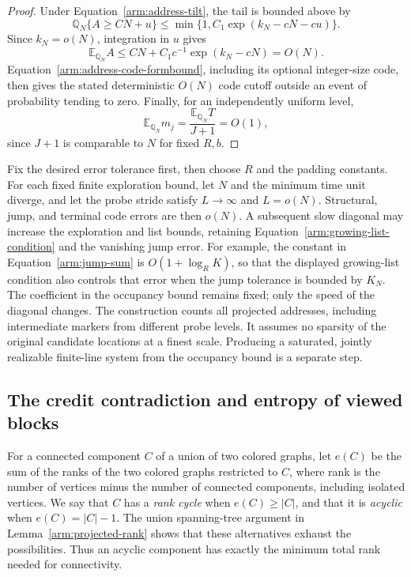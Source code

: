 \begin{proof}
Under Equation~\eqref{arm:address-tilt}, the tail is bounded above by
\[
 \mathbb Q_N\{A\geq CN+u\}
 \leq\min\{1,C_1\exp(k_N-cN-cu)\}.
\]
Since $k_N=o(N)$, integration in $u$ gives
\[
 \mathbb E_{\mathbb Q_N}A
 \leq CN+C_1c^{-1}\exp(k_N-cN)=O(N).
\]
Equation~\eqref{arm:address-code-formbound}, including its optional
integer-size code, then gives the stated deterministic $O(N)$ code
cutoff outside an event of probability tending to zero.  Finally,
for an independently uniform level,
\[
 \mathbb E_{\mathbb Q_N}m_j
 =\frac{\mathbb E_{\mathbb Q_N}T}{J+1}=O(1),
\]
since $J+1$ is comparable to $N$ for fixed $R,b$.
\end{proof}

\begin{remark}
Fix the desired error tolerance first, then choose $R$ and the padding
constants.  For each fixed finite exploration bound, let $N$ and the
minimum time unit diverge, and let the probe stride satisfy
$L\longrightarrow\infty$ and $L=o(N)$.  Structural, jump, and terminal
code errors are then $o(N)$.  A subsequent slow diagonal may increase
the exploration and list bounds, retaining
Equation~\eqref{arm:growing-list-condition} and the vanishing jump
error.  For example, the constant in Equation~\eqref{arm:jump-sum}
is $O(1+\log_R K)$, so that the displayed growing-list condition also
controls that error when the jump tolerance is bounded by $K_N$.
The coefficient in the occupancy bound remains fixed; only the speed
of the diagonal changes.  The construction counts all projected
addresses, including intermediate markers from different probe levels.
It assumes no sparsity of the original candidate locations at a finest
scale.  Producing a saturated, jointly realizable finite-line system
from the occupancy bound is a separate step.
\end{remark}
\subsection{The credit contradiction and entropy of viewed blocks}

For a connected component $C$ of a union of two colored graphs, let
$e(C)$ be the sum of the ranks of the two colored graphs restricted to
$C$, where rank is the number of vertices minus the number of connected
components, including isolated vertices.  We say that $C$ has a
\emph{rank cycle} when $e(C)\ge |C|$, and that it is \emph{acyclic}
when $e(C)=|C|-1$.  The union spanning-tree argument in
Lemma~\ref{arm:projected-rank} shows that these alternatives exhaust the
possibilities.  Thus an acyclic component has exactly the minimum total
rank needed for connectivity.

